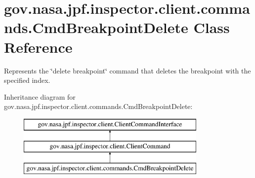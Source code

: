 \hypertarget{classgov_1_1nasa_1_1jpf_1_1inspector_1_1client_1_1commands_1_1_cmd_breakpoint_delete}{}\section{gov.\+nasa.\+jpf.\+inspector.\+client.\+commands.\+Cmd\+Breakpoint\+Delete Class Reference}
\label{classgov_1_1nasa_1_1jpf_1_1inspector_1_1client_1_1commands_1_1_cmd_breakpoint_delete}


Represents the \char`\"{}delete breakpoint\char`\"{} command that deletes the breakpoint with the specified index.  


Inheritance diagram for gov.\+nasa.\+jpf.\+inspector.\+client.\+commands.\+Cmd\+Breakpoint\+Delete\+:\begin{figure}[H]
\begin{center}
\leavevmode
\includegraphics[height=3.000000cm]{classgov_1_1nasa_1_1jpf_1_1inspector_1_1client_1_1commands_1_1_cmd_breakpoint_delete}
\end{center}
\end{figure}
